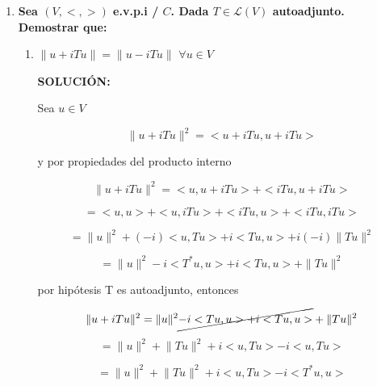 \documentclass[12pt,a4paper]{article}
\providecommand{\norm}[1]{\lVert#1\rVert}
\begin{document}
\begin{enumerate}
    \item \textbf{Sea $(V,<,>)$ e.v.p.i / $C$. Dada $T \in \mathcal{L}(V)$ autoadjunto. Demostrar que:}
    \begin{enumerate}
        \item $\norm{u+iTu}=\norm{u-iTu}$  $\forall u \in V$
        
        \textbf{SOLUCIÓN:}
        
        Sea $u \in V$
        
        \begin{equation*}
            \norm{u+iTu}^2=<u+iTu,u+iTu>
        \end{equation*}
        
        y por propiedades del producto interno
        
        \begin{equation*}
            \norm{u+iTu}^2=<u,u+iTu>+<iTu,u+iTu>
        \end{equation*}
        
        \begin{equation*}
            =<u,u>+<u,iTu>+<iTu,u>+<iTu,iTu>
        \end{equation*}
        
        \begin{equation*}
            =\norm{u}^2+(-i)<u,Tu>+i<Tu,u>+i(-i)\norm{Tu}^2
        \end{equation*}
        
        \begin{equation*}
            =\norm{u}^2-i<T^*u,u>+i<Tu,u>+\norm{Tu}^2
        \end{equation*}
        
        por hipótesis T es autoadjunto, entonces
        
        \begin{equation*}
            \norm{u+iTu}^2=\norm{u}^2\cancel{-i<Tu,u>+i<Tu,u>}+\norm{Tu}^2
        \end{equation*}
        
        \begin{equation*}
            =\norm{u}^2+\norm{Tu}^2+i<u,Tu>-i<u,Tu>
        \end{equation*}
        
        \begin{equation*}
            =\norm{u}^2+\norm{Tu}^2+i<u,Tu>-i<T^*u,u>
        \end{equation*}
        

\end{enumerate}
\end{enumerate}
\end{document}
